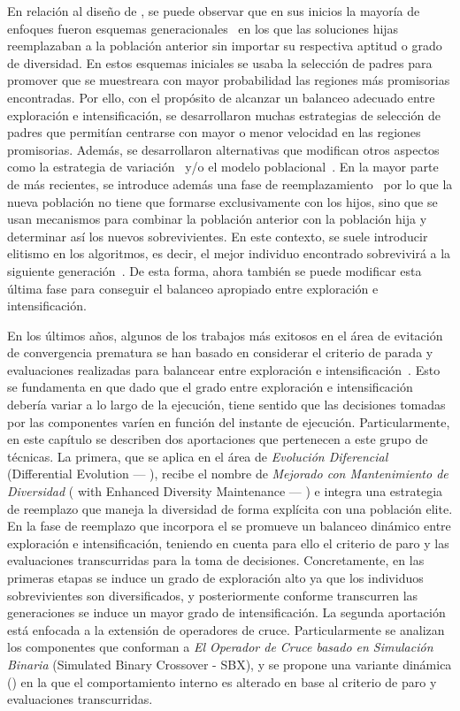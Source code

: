 En relación al diseño de \EAS{}, se puede observar que en sus inicios la mayoría de enfoques fueron esquemas generacionales~\cite{de2006evolutionary} en los 
que las soluciones hijas reemplazaban a la población anterior sin importar su respectiva aptitud o grado de diversidad.
%
En estos esquemas iniciales se usaba la selección de padres para promover que se muestreara con mayor probabilidad las regiones más promisorias encontradas. 
%
Por ello, con el propósito de alcanzar un balanceo adecuado entre exploración e intensificación, se desarrollaron muchas estrategias de selección de padres
que permitían centrarse con mayor o menor velocidad en las regiones promisorias.
%
Además, se desarrollaron alternativas que modifican otros aspectos como la estrategia de variación~\cite{Joel:herrera2003fuzzy} y/o 
el modelo poblacional~\cite{alba2005parallel}.
%
En la mayor parte de \EAS{} más recientes, se introduce además una fase de reemplazamiento~\cite{eiben2003introduction} por lo que
la nueva población no tiene que formarse exclusivamente con los hijos,
sino que se usan mecanismos para combinar la población anterior con la población hija y determinar así los nuevos sobrevivientes.
%
En este contexto, se suele introducir elitismo en los algoritmos, es decir, el mejor individuo encontrado sobrevivirá a la siguiente generación~\cite{Joel:CHC}.
%
De esta forma, ahora también se puede modificar esta última fase para conseguir el balanceo apropiado entre exploración e intensificación.

En los últimos años, algunos de los trabajos más exitosos en el área de evitación de convergencia prematura se han basado en considerar el criterio de parada y evaluaciones
realizadas para balancear entre exploración e intensificación~\cite{segura2016novel}.
%
Esto se fundamenta en que dado que el grado entre exploración e intensificación debería variar a lo largo de la ejecución, tiene sentido que las decisiones tomadas por
las componentes varíen en función del instante de ejecución.
%
%
Particularmente, en este capítulo se describen dos aportaciones que pertenecen a este grupo de técnicas.
%
La primera, que se aplica en el área de \textit{Evolución Diferencial} (Differential Evolution --- \DE{}), recibe el nombre de \DE{} \textit{Mejorado con Mantenimiento de Diversidad} 
(\DE{} with Enhanced Diversity Maintenance --- \DEEDM{}) e integra una estrategia de reemplazo que maneja la diversidad de forma explícita con una población elite.
%
En la fase de reemplazo que incorpora el \DEEDM{} se promueve un balanceo dinámico entre exploración e intensificación, teniendo en cuenta para ello el criterio de paro
y las evaluaciones transcurridas para la toma de decisiones.
%
Concretamente, en las primeras etapas se induce un grado de exploración alto ya que los individuos sobrevivientes son diversificados, y posteriormente conforme transcurren las 
generaciones se induce un mayor grado de intensificación.
% 
La segunda aportación está enfocada a la extensión de operadores de cruce.
%
Particularmente se analizan los componentes que conforman a \textit{El Operador de Cruce basado en Simulación Binaria} (Simulated Binary Crossover - SBX), 
y se propone una variante dinámica (\DSBX{}) en la que el comportamiento interno es alterado en base al criterio de paro y evaluaciones transcurridas.


